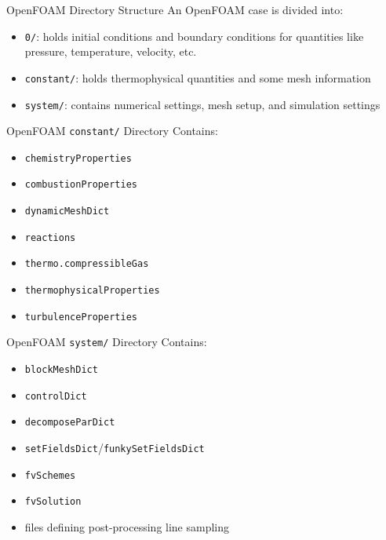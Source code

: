 \begin{frame}{OpenFOAM Directory Structure}
An OpenFOAM case is divided into:
\begin{itemize}
\item \texttt{0/}: holds initial conditions and boundary conditions for quantities like pressure, temperature, velocity, etc. 
\item \texttt{constant/}: holds thermophysical quantities and some mesh information 
\item \texttt{system/}: contains numerical settings, mesh setup, and simulation settings
\end{itemize}
\end{frame}

\begin{frame}{OpenFOAM \texttt{constant/} Directory}
Contains:
\begin{itemize}
\item \texttt{chemistryProperties}
\item \texttt{combustionProperties}
\item \texttt{dynamicMeshDict}
\item \texttt{reactions}
\item \texttt{thermo.compressibleGas}
\item \texttt{thermophysicalProperties}
\item \texttt{turbulenceProperties}
\end{itemize}
\end{frame}

\begin{frame}{OpenFOAM \texttt{system/} Directory}
Contains:
\begin{itemize}
\item \texttt{blockMeshDict}
\item \texttt{controlDict}
\item \texttt{decomposeParDict}
\item \texttt{setFieldsDict}/\texttt{funkySetFieldsDict}
\item \texttt{fvSchemes}
\item \texttt{fvSolution}
\item files defining post-processing line sampling
\end{itemize}
\end{frame}

